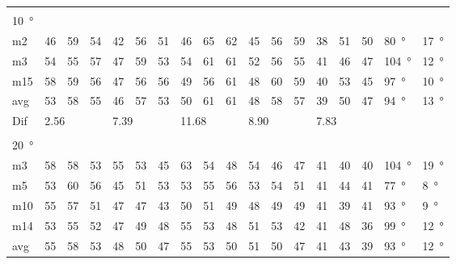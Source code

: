 \begin{table}[H]
\begin{tabular}{l|l|l|l|l|l|l|l|l|l|l|l|l|l|l|l|l|l}
 \multicolumn{18}{l}{ } \\                             
\SI{10}{\degree}   & \multicolumn{3}{l|}{} & \multicolumn{3}{l|}{} & \multicolumn{3}{l|}{} & \multicolumn{3}{l|}{} &  \multicolumn{3}{l|}{}   &  \multicolumn{2}{l}{} \\  \hline
m2    &  46    &  59    &  54    &  42    &  56    &   51   &  46    &   65    &   62   &   45    &  56    &  59    & 38 & 51 &50   & \SI{80}{\degree} & \SI{17}{\degree} \\
m3    &  54    &  55    &  57    &   47   &  59    &   53   &   54   &  61     &   61   &   52    & 56     &  55    & 41 & 46 &47  & \SI{104}{\degree} & \SI{12}{\degree} \\
m15  &  58    &  59    &  56    &  47    & 56     &   56   &   49   &   56    &   61   &    48   &   60   &  59    & 40 & 53 &45   & \SI{97}{\degree} & \SI{10}{\degree}\\ \hline
avg &  53    & 58     & 55     & 46     &   57   & 53     &  50    &  61     &  61    &  48     & 58     & 57     & 39 & 50 &  47 & \SI{94}{\degree} & \SI{13}{\degree} \\ \hline  
Dif & \multicolumn{3}{l|}{2.56} & \multicolumn{3}{l|}{7.39} & \multicolumn{3}{l|}{11.68} & \multicolumn{3}{l|}{8.90} & \multicolumn{3}{l|}{7.83} &  \multicolumn{2}{l}{} \\      
\multicolumn{18}{l}{ } \\                
\SI{20}{\degree}   & \multicolumn{3}{l|}{} & \multicolumn{3}{l|}{} & \multicolumn{3}{l|}{} & \multicolumn{3}{l|}{} &  \multicolumn{3}{l|}{}   &  \multicolumn{2}{l}{} \\  \hline
m3    &  58    &  58    &  53    &  55    &  53    &  45    &   63   &    54   &  48    &  54     &  46    &  47    & 41 & 40 &40  & \SI{104}{\degree} & \SI{19}{\degree}  \\
m5    &  53    &  60    &  56    &  45    &  51    & 53     &   53   &  55     &  56    &  53     &  54    &   51   & 41 & 44 &41   & \SI{77}{\degree} & \SI{8}{\degree} \\
m10  &  55    &  57    &  51    &  47    &   47   &   43   &   50   &   51    &   49   &  48     & 49     & 49     & 41 & 39 &41  & \SI{93}{\degree} & \SI{9}{\degree}  \\
m14  &  53    &  55    &  52    &  47    &  49    &   48   &    55  &  53     &   48   &  51     &  53    &  42    & 41 & 48 & 36  & \SI{99}{\degree} & \SI{12}{\degree} \\ \hline
avg & 55     &  58    &  53    &   48   &  50    &  47    &  55    &   53    &  50    &  51     & 50     &  47    & 41 & 43  & 39   & \SI{93}{\degree} & \SI{12}{\degree} \\ \hline  

\end{tabular}
\end{table}
